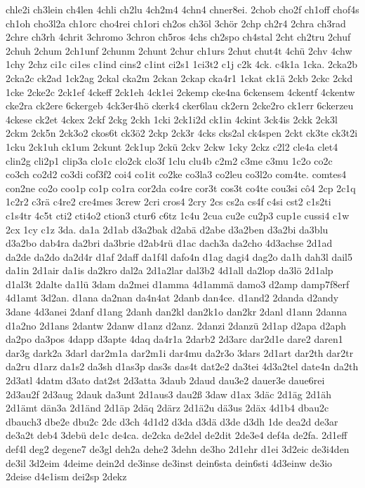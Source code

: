 {chle2i
ch3lein
ch4len
4chli
ch2lu
4ch2m4
4chn4
chner8ei.
2chob
cho2f
ch1off
chof4s
ch1oh
cho3l2a
ch1orc
cho4rei
ch1ori
ch2os
ch3öl
3chör
2chp
ch2r4
2chra
ch3rad
2chre
ch3rh
4chrit
3chromo
3chron
ch5ros
4chs
ch2spo
ch4stal
2cht
ch2tru
2chuf
2chuh
2chum
2ch1unf
2chunm
2chunt
2chur
ch1urs
2chut
chut4t
4chü
2chv
4chw
1chy
2chz
ci1c
ci1es
c1ind
cins2
c1int
ci2s1
1ci3t2
c1j
c2k
4ck.
c4k1a
1cka.
2cka2b
2cka2c
ck2ad
1ck2ag
2ckal
cka2m
2ckan
2ckap
cka4r1
1ckat
ck1ä
2ckb
2ckc
2ckd
1cke
2cke2c
2ck1ef
4ckeff
2ck1eh
4ck1ei
2ckemp
cke4na
6ckensem
4ckentf
4ckentw
cke2ra
ck2ere
6ckergeb
4ck3er4hö
ckerk4
cker6lau
ck2ern
2cke2ro
ck1err
6ckerzeu
4ckese
ck2et
4ckex
2ckf
2ckg
2ckh
1cki
2ck1i2d
ck1in
4ckint
3ck4is
2ckk
2ck3l
2ckm
2ck5n
2ck3o2
ckos6t
ck3ö2
2ckp
2ck3r
4cks
cks2al
ck4spen
2ckt
ck3te
ck3t2i
1cku
2ck1uh
ck1um
2ckunt
2ck1up
2ckü
2ckv
2ckw
1cky
2ckz
c2l2
cle4a
clet4
clin2g
cli2p1
clip3a
clo1c
clo2ck
clo3f
1clu
clu4b
c2m2
c3me
c3mu
1c2o
co2c
co3ch
co2d2
co3di
cof3f2
coi4
co1it
co2ke
co3la3
co2leu
co3l2o
com4te.
comtes4
con2ne
co2o
coo1p
co1p
co1ra
cor2da
co4re
cor3t
cos3t
co4te
cou3si
cô4
2cp
2c1q
1c2r2
c3rä
c4re2
cre4mes
3crew
2cri
cros4
2cry
2cs
cs2a
cs4f
c4si
cst2
c1s2ti
c1s4tr
4c5t
cti2
cti4o2
ction3
ctur6
c6tz
1c4u
2cua
cu2e
cu2p3
cup1e
cussi4
c1w
2cx
1cy
c1z
3da.
da1a
2d1ab
d3a2bak
d2abä
d2abe
d3a2ben
d3a2bi
da3blu
d3a2bo
dab4ra
da2bri
da3brie
d2ab4rü
d1ac
dach3a
da2cho
4d3achse
2d1ad
da2de
da2do
da2d4r
d1af
2daff
da1f4l
dafo4n
d1ag
dagi4
dag2o
da1h
dah3l
dail5
da1in
2d1air
da1is
da2kro
dal2a
2d1a2lar
dal3b2
4d1all
da2lop
da3lö
2d1alp
d1al3t
2dalte
da1lü
3dam
da2mei
d1amma
4d1ammä
damo3
d2amp
damp7f8erf
4d1amt
3d2an.
d1ana
da2nan
da4n4at
2danb
dan4ce.
d1and2
2danda
d2andy
3dane
4d3anei
2danf
d1ang
2danh
dan2kl
dan2k1o
dan2kr
2danl
d1ann
2danna
d1a2no
2d1ans
2dantw
2danw
d1anz
d2anz.
2danzi
2danzü
2d1ap
d2apa
d2aph
da2po
da3pos
4dapp
d3apte
4daq
da4r1a
2darb2
2d3arc
dar2d1e
dare2
daren1
dar3g
dark2a
3darl
dar2m1a
dar2m1i
dar4mu
da2r3o
3dars
2d1art
dar2th
dar2tr
da2ru
d1arz
da1s2
da3sh
d1as3p
das3s
das4t
dat2e2
da3tei
4d3a2tel
date4n
da2th
2d3atl
4datm
d3ato
dat2st
2d3atta
3daub
2daud
dau3e2
dauer3e
daue6rei
2d3au2f
2d3aug
2dauk
da3unt
2d1aus3
dau2ß
3daw
d1ax
3däc
2d1äg
2d1äh
2d1ämt
dän3a
2d1änd
2d1äp
2däq
2därz
2d1ä2u
dä3us
2däx
4d1b4
dbau2c
dbauch3
dbe2e
dbu2c
2dc
d3ch
4d1d2
d3da
d3dä
d3de
d3dh
1de
dea2d
de3ar
de3a2t
deb4
3debü
de1c
de4ca.
de2cka
de2del
de2dit
2de3e4
def4a
de2fa.
2d1eff
def4l
deg2
degene7
de3gl
deh2a
dehe2
3dehn
de3ho
2d1ehr
d1ei
3d2eic
de3i4den
de3il
3d2eim
4deime
dein2d
de3inse
de3inst
dein6sta
dein6sti
4d3einw
de3io
2deise
d4e1ism
dei2sp
2dekz
}
